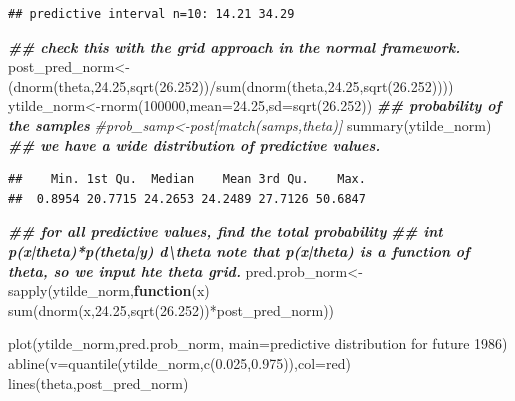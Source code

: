 \documentclass[
]{book}
\newenvironment{Shaded}{\begin{snugshade}}{\end{snugshade}}
\newcommand{\AttributeTok}[1]{\textcolor[rgb]{0.77,0.63,0.00}{#1}}
\newcommand{\CommentTok}[1]{\textcolor[rgb]{0.56,0.35,0.01}{\textit{#1}}}
\newcommand{\ControlFlowTok}[1]{\textcolor[rgb]{0.13,0.29,0.53}{\textbf{#1}}}
\newcommand{\DecValTok}[1]{\textcolor[rgb]{0.00,0.00,0.81}{#1}}
\newcommand{\DocumentationTok}[1]{\textcolor[rgb]{0.56,0.35,0.01}{\textbf{\textit{#1}}}}
\newcommand{\FloatTok}[1]{\textcolor[rgb]{0.00,0.00,0.81}{#1}}
\newcommand{\FunctionTok}[1]{\textcolor[rgb]{0.00,0.00,0.00}{#1}}
\newcommand{\NormalTok}[1]{#1}
\newcommand{\OtherTok}[1]{\textcolor[rgb]{0.56,0.35,0.01}{#1}}
\newcommand{\SpecialCharTok}[1]{\textcolor[rgb]{0.00,0.00,0.00}{#1}}
\newcommand{\StringTok}[1]{\textcolor[rgb]{0.31,0.60,0.02}{#1}}
\theoremstyle{definition}
\theoremstyle{definition}
\theoremstyle{definition}
\theoremstyle{definition}
\theoremstyle{remark}
\begin{document}
\begin{verbatim}
## predictive interval n=10: 14.21 34.29
\end{verbatim}

\begin{Shaded}
\begin{Highlighting}[]
   \DocumentationTok{\#\# check this with the grid approach in the normal framework.  }
\NormalTok{  post\_pred\_norm}\OtherTok{\textless{}{-}}\NormalTok{(}\FunctionTok{dnorm}\NormalTok{(theta,}\FloatTok{24.25}\NormalTok{,}\FunctionTok{sqrt}\NormalTok{(}\FloatTok{26.252}\NormalTok{))}\SpecialCharTok{/}\FunctionTok{sum}\NormalTok{(}\FunctionTok{dnorm}\NormalTok{(theta,}\FloatTok{24.25}\NormalTok{,}\FunctionTok{sqrt}\NormalTok{(}\FloatTok{26.252}\NormalTok{))))}
\NormalTok{   ytilde\_norm}\OtherTok{\textless{}{-}}\FunctionTok{rnorm}\NormalTok{(}\DecValTok{100000}\NormalTok{,}\AttributeTok{mean=}\FloatTok{24.25}\NormalTok{,}\AttributeTok{sd=}\FunctionTok{sqrt}\NormalTok{(}\FloatTok{26.252}\NormalTok{)) }
 \DocumentationTok{\#\# probability of the samples }
 \CommentTok{\#prob\_samp\textless{}{-}post[match(samps,theta)]}
  \FunctionTok{summary}\NormalTok{(ytilde\_norm) }\DocumentationTok{\#\# we have a wide distribution of predictive values.}
\end{Highlighting}
\end{Shaded}

\begin{verbatim}
##    Min. 1st Qu.  Median    Mean 3rd Qu.    Max. 
##  0.8954 20.7715 24.2653 24.2489 27.7126 50.6847
\end{verbatim}

\begin{Shaded}
\begin{Highlighting}[]
\DocumentationTok{\#\# for all predictive values,  find the total probability  }
   \DocumentationTok{\#\# int p(x|theta)*p(theta|y) d\textbackslash{}theta  note that p(x|theta) is a function of theta, so we input hte theta grid.}
\NormalTok{ pred.prob\_norm}\OtherTok{\textless{}{-}}\FunctionTok{sapply}\NormalTok{(ytilde\_norm,}\ControlFlowTok{function}\NormalTok{(x) }\FunctionTok{sum}\NormalTok{(}\FunctionTok{dnorm}\NormalTok{(x,}\FloatTok{24.25}\NormalTok{,}\FunctionTok{sqrt}\NormalTok{(}\FloatTok{26.252}\NormalTok{))}\SpecialCharTok{*}\NormalTok{post\_pred\_norm))  }
  
 \FunctionTok{plot}\NormalTok{(ytilde\_norm,pred.prob\_norm, }\AttributeTok{main=}\StringTok{\textquotesingle{}predictive distribution for future 1986\textquotesingle{}}\NormalTok{)}
 \FunctionTok{abline}\NormalTok{(}\AttributeTok{v=}\FunctionTok{quantile}\NormalTok{(ytilde\_norm,}\FunctionTok{c}\NormalTok{(}\FloatTok{0.025}\NormalTok{,}\FloatTok{0.975}\NormalTok{)),}\AttributeTok{col=}\StringTok{\textquotesingle{}red\textquotesingle{}}\NormalTok{)}
 \FunctionTok{lines}\NormalTok{(theta,post\_pred\_norm)}
\end{Highlighting}
\end{Shaded}
\end{document}
